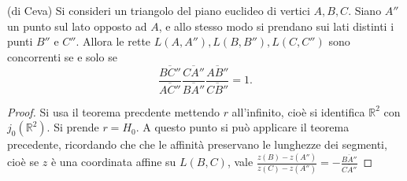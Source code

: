 \begin{thm}
    (di Ceva) Si consideri un triangolo del piano euclideo di vertici $A,B,C$.
    Siano $A''$ un punto sul lato opposto ad $A$, e allo stesso modo si prendano
    sui lati distinti i punti $B''$ e $C''$. Allora le rette $L(A,A''),
    L(B,B''), L(C,C'')$ sono concorrenti se e solo se
    \[
        \frac{\overline{BC''}}{\overline{AC''}}
        \frac{\overline{CA''}}{\overline{BA''}}
        \frac{\overline{AB''}}{\overline{CB''}} = 1.
    \]
\end{thm}


\begin{proof}
    Si usa il teorema precdente mettendo $r$ all'infinito, cio\`e si identifica
    $\mathbb{R}^2$ con $j_0(\mathbb{R}^2)$. Si prende $r=H_0$. A questo punto si
    pu\`o applicare il teorema precedente, ricordando che che le affinit\`a
    preservano le lunghezze dei segmenti, cio\`e se $z$ \`e una coordinata
    affine su $L(B,C)$, vale $\frac{z(B)-z(A'')}{z(C)-z(A'')} =
        -\frac{\overline{BA''}}{\overline{CA''}}$
\end{proof}

